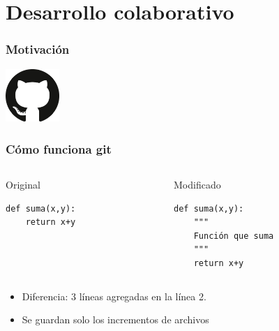 \documentclass[14pt,aspectratio=169,xcolor=dvipsnames]{beamer}
\begin{document}
\section{Desarrollo colaborativo}
\begin{frame}\frametitle{Motivación}
    {\huge
    \begin{center}
    \end{center}
    }
    \begin{flushright}
    \includegraphics[height=2cm]{../images/logos/git.png}
    \end{flushright}
\end{frame}
\begin{frame}[t,fragile]\frametitle{Cómo funciona git}
  \begin{columns}
    \begin{column}[t]{0.45\textwidth}
        Original
        \begin{verbatim}
def suma(x,y):
    return x+y
        \end{verbatim}
    \end{column}
    \begin{column}[t]{0.45\textwidth}
        Modificado
        \begin{verbatim}
def suma(x,y):
    """
    Función que suma
    """
    return x+y
        \end{verbatim}
    \end{column}
  \end{columns}

  \vspace{1cm}
  \begin{itemize}
  \item Diferencia: 3 líneas agregadas en la línea 2. 

  \item Se guardan solo los \alert{incrementos} de archivos
  \end{itemize}
\end{frame}
\end{document}
